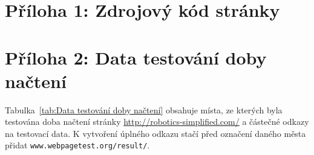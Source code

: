 \documentclass[a4paper, 12pt]{article}
\begin{document}
  \newpage

  \section{Příloha 1: Zdrojový kód stránky} \label{sec:Příloha 1: Zdrojový kód webové stránky}

  \newpage

  \section{Příloha 2: Data testování doby načtení} \label{sec:Příloha 2: Data testování doby načtení}
  Tabulka~\ref{tab:Data testování doby načtení} obsahuje místa, ze kterých byla testována doba načtení stránky \url{http://robotics-simplified.com/} a částečné odkazy na testovací data. K vytvoření úplného odkazu stačí před označení daného města přidat \texttt{www.webpagetest.org/result/}.
\end{document}

